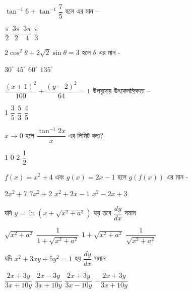 \documentclass[addpoints]{exam}
\begin{document}
\begin{questions}
\question $ \tan^{-1}6+ \tan^{-1}\dfrac{7}{5} $  হলে এর মান – 

\begin{oneparchoices}
\choice $ \dfrac{\pi}{2} $
\choice $ \dfrac{3\pi}{2} $
\choice $ \dfrac{3\pi}{4} $
\choice $ \dfrac{\pi}{3} $
\end{oneparchoices}

\question $ 2\cos^{2}\theta + 2\sqrt{2}\sin\theta = 3 $ হলে $ \theta $ এর মান -  

\begin{oneparchoices}
\choice $ 30^{\circ} $
\choice $ 45^{\circ} $
\choice $ 60^{\circ} $
\choice  $ 135^{\circ} $
\end{oneparchoices}

\question $ \dfrac{(x+1)^{2}}{100} + \dfrac{(y-2)^{2}}{64} = 1 $ উপবৃত্তের উৎকেনন্দ্রিকতা – 

\begin{oneparchoices}
\choice $ 1 $
\choice $ \dfrac{3}{5} $
\choice $ \dfrac{5}{3} $
\choice $ \dfrac{4}{5} $
\end{oneparchoices}

\question $ x\to 0 $ হলে $ \dfrac{\tan^{-1}2x}{x} $ এর লিমিট কত?

\begin{oneparchoices}
\choice $ 1 $
\choice $ 0 $
\choice $ 2 $
\choice $ \dfrac{1}{2} $
\end{oneparchoices}

\question $ f(x) = x^{2}+4 $ এবং $ g(x) = 2x-1 $ হলে $ g(f(x)) $ এর মান -  

\begin{oneparchoices}
\choice $ 2x^{2}+7 $
\choice $ 7x^{2}+2 $
\choice $ x^{2}+2x-1 $
\choice $ x^{2}-2x+3 $
\end{oneparchoices}

\question যদি $ y= \ln (x+\sqrt{x^{2}+a^{2}}) $ হয় তবে $ \dfrac{dy}{dx} $ সমান

\begin{oneparchoices}
\choice $ \sqrt{x^{2}+a^{2}} $
\choice  $ \dfrac{1}{1+\sqrt{x^{2}+a^{2}}} $
\choice  $ 1+\sqrt{x^{2}+a^{2}} $
\choice $ \dfrac{1}{\sqrt{x^{2}+a^{2}}} $
\end{oneparchoices}

\question যদি $ x^{2}+3xy+5y^{2} = 1 $ হয় $ \dfrac{dy}{dx} $ সমান

\begin{oneparchoices}
\choice $ \dfrac{2x+3y}{3x+10y} $
\choice $ \dfrac{2x-3y}{3x+10y} $
\choice $ \dfrac{2x+3y}{3x-10y} $
\choice $ -\dfrac{2x+3y}{3x+10y} $
\end{oneparchoices}


\end{questions}
\end{document}
